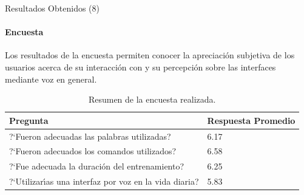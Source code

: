 \begin{frame}{Resultados Obtenidos (8)}
\framesubtitle{Encuesta}
Los resultados de la encuesta permiten conocer la apreciaci\'on subjetiva de
los usuarios acerca de su interacci\'on con  y su percepci\'on
sobre las interfaces mediante voz en general.

\begin{table}[H] 
\centering
\footnotesize
\caption{Resumen de la encuesta realizada.}
\begin{tabular}{|l|l|}
\hline
Pregunta & Respuesta Promedio \\
\hline
{?`}Fueron adecuadas las palabras utilizadas? & 6.17 \\
{?`}Fueron adecuados los comandos utilizados? & 6.58 \\
{?`}Fue adecuada la duraci\'on del entrenamiento? & 6.25 \\
{?`}Utilizar{\'\i}as una interfaz por voz en la vida diaria? & 5.83 \\
\hline
\end{tabular}
\label{sec:tabla-encuesta}
\end{table}
\end{frame}
